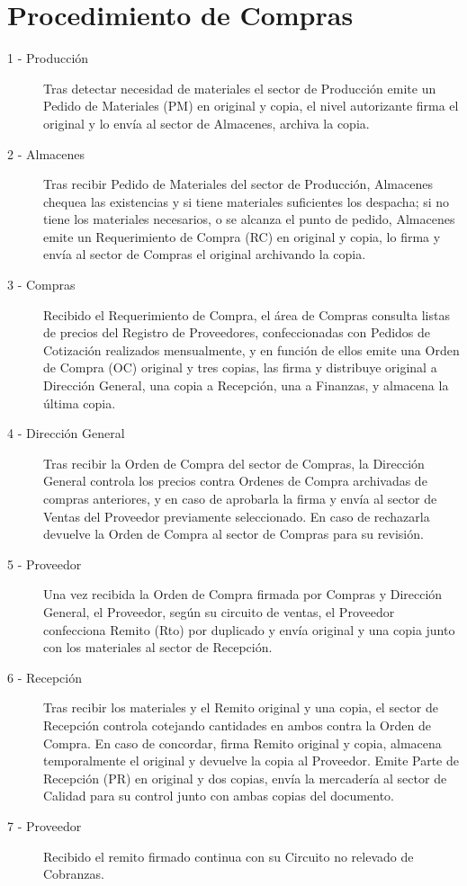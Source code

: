 \section{Procedimiento de Compras}
\begin{description}
\item[1 - Producción] Tras detectar necesidad de materiales el sector de Producción emite un Pedido de Materiales (PM) en original y copia, el nivel autorizante firma el original y lo envía al sector de Almacenes, archiva la copia.
\item[2 - Almacenes] Tras recibir Pedido de Materiales del sector de Producción, Almacenes chequea las existencias y si tiene materiales suficientes los despacha; si no tiene los materiales necesarios, o se alcanza el punto de pedido, Almacenes emite un Requerimiento de Compra (RC) en original y copia, lo firma y envía al sector de Compras el original archivando la copia.
\item[3 - Compras] Recibido el Requerimiento de Compra, el área de Compras consulta listas de precios del Registro de Proveedores, confeccionadas con Pedidos de Cotización realizados mensualmente, y en función de ellos emite una Orden de Compra (OC) original y tres copias, las firma y distribuye original a Dirección General, una copia a Recepción, una a Finanzas, y almacena la última copia.
\item [4 - Dirección General] Tras recibir la Orden de Compra del sector de Compras, la Dirección General controla los precios contra Ordenes de Compra archivadas de compras anteriores, y en caso de aprobarla la firma y envía al sector de Ventas del Proveedor previamente seleccionado. En caso de rechazarla devuelve la Orden de Compra al sector de Compras para su revisión.
\item [5 - Proveedor] Una vez recibida la Orden de Compra firmada por Compras y Dirección General, el Proveedor, según su circuito de ventas, el Proveedor confecciona Remito (Rto) por duplicado y envía original y una copia junto con los materiales al sector de Recepción.
\item[6 - Recepción] Tras recibir los materiales y el Remito original y una copia, el sector de Recepción controla cotejando cantidades en ambos contra la Orden de Compra. En caso de concordar, firma Remito original y copia, almacena temporalmente el original y devuelve la copia al Proveedor. Emite Parte de Recepción (PR) en original y dos copias, envía la mercadería al sector de Calidad para su control junto con ambas copias del documento.
\item [7 - Proveedor] Recibido el remito firmado continua con su Circuito no relevado de Cobranzas.

\end{description}
